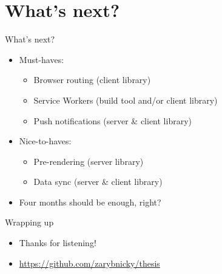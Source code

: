 \documentclass[presentation]{beamer}
\begin{document}
\section{What's next?}
\label{sec:org7a59691}
\begin{frame}[label={sec:org1d88469}]{What's next?}
\begin{itemize}
\item Must-haves:
\begin{itemize}
\item Browser routing (client library)
\item Service Workers (build tool and/or client library)
\item Push notifications (server \& client library)
\end{itemize}
\end{itemize}
\pause
\begin{itemize}
\item Nice-to-haves:
\begin{itemize}
\item Pre-rendering (server library)
\item Data sync (server \& client library)
\end{itemize}
\end{itemize}
\pause
\begin{itemize}
\item Four months should be enough, right? \Smiley
\end{itemize}
\end{frame}

\begin{frame}[label={sec:orge53a0c0}]{Wrapping up}
\begin{itemize}
\item Thanks for listening!
\end{itemize}

\begin{itemize}
\item \url{https://github.com/zarybnicky/thesis}
\end{itemize}
\end{frame}
\end{document}
